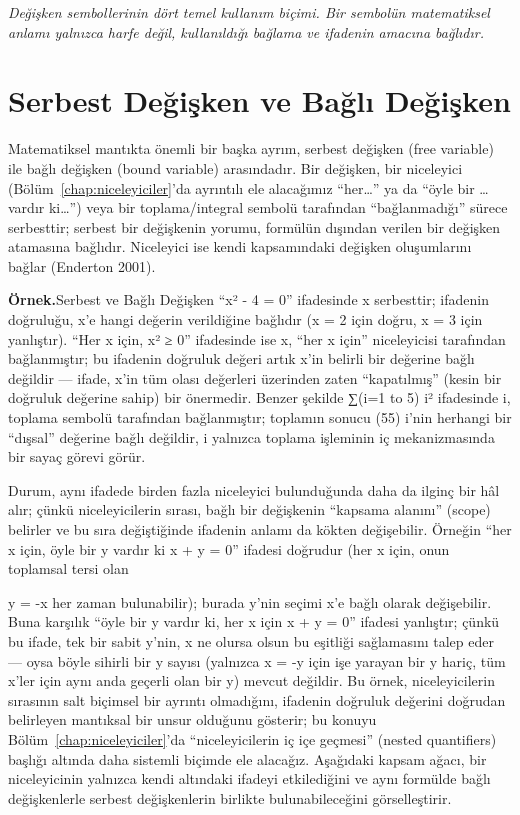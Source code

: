 {\small\itshape\sffamily\color{gray}Değişken sembollerinin dört temel kullanım biçimi. Bir sembolün matematiksel anlamı yalnızca harfe değil, kullanıldığı bağlama ve ifadenin amacına bağlıdır.}

\section{Serbest Değişken ve Bağlı Değişken}

Matematiksel mantıkta önemli bir başka ayrım, serbest değişken (free variable) ile bağlı değişken (bound variable) arasındadır. Bir değişken, bir niceleyici (Bölüm~\ref{chap:niceleyiciler}’da ayrıntılı ele alacağımız “her…” ya da “öyle bir … vardır ki…”) veya bir toplama/integral sembolü tarafından “bağlanmadığı” sürece serbesttir; serbest bir değişkenin yorumu, formülün dışından verilen bir değişken atamasına bağlıdır. Niceleyici ise kendi kapsamındaki değişken oluşumlarını bağlar (Enderton 2001).

\begin{tcolorbox}[bookbox,colback=cEx]\textbf{\textsf{\textcolor{cAcc}{Örnek.}}}\quad Serbest ve Bağlı Değişken “x² - 4 = 0” ifadesinde x serbesttir; ifadenin doğruluğu, x’e hangi değerin verildiğine bağlıdır (x = 2 için doğru, x = 3 için yanlıştır). “Her x için, x² ≥ 0” ifadesinde ise x, “her x için” niceleyicisi tarafından bağlanmıştır; bu ifadenin doğruluk değeri artık x’in belirli bir değerine bağlı değildir — ifade, x’in tüm olası değerleri üzerinden zaten “kapatılmış” (kesin bir doğruluk değerine sahip) bir önermedir. Benzer şekilde ∑(i=1 to 5) i² ifadesinde i, toplama sembolü tarafından bağlanmıştır; toplamın sonucu (55) i’nin herhangi bir “dışsal” değerine bağlı değildir, i yalnızca toplama işleminin iç mekanizmasında bir sayaç görevi görür.\end{tcolorbox}

Durum, aynı ifadede birden fazla niceleyici bulunduğunda daha da ilginç bir hâl alır; çünkü niceleyicilerin sırası, bağlı bir değişkenin “kapsama alanını” (scope) belirler ve bu sıra değiştiğinde ifadenin anlamı da kökten değişebilir. Örneğin “her x için, öyle bir y vardır ki x + y = 0” ifadesi doğrudur (her x için, onun toplamsal tersi olan

y = -x her zaman bulunabilir); burada y’nin seçimi x’e bağlı olarak değişebilir. Buna karşılık “öyle bir y vardır ki, her x için x + y = 0” ifadesi yanlıştır; çünkü bu ifade, tek bir sabit y’nin, x ne olursa olsun bu eşitliği sağlamasını talep eder — oysa böyle sihirli bir y sayısı (yalnızca x = -y için işe yarayan bir y hariç, tüm x’ler için aynı anda geçerli olan bir y) mevcut değildir. Bu örnek, niceleyicilerin sırasının salt biçimsel bir ayrıntı olmadığını, ifadenin doğruluk değerini doğrudan belirleyen mantıksal bir unsur olduğunu gösterir; bu konuyu Bölüm~\ref{chap:niceleyiciler}’da “niceleyicilerin iç içe geçmesi” (nested quantifiers) başlığı altında daha sistemli biçimde ele alacağız. Aşağıdaki kapsam ağacı, bir niceleyicinin yalnızca kendi altındaki ifadeyi etkilediğini ve aynı formülde bağlı değişkenlerle serbest değişkenlerin birlikte bulunabileceğini görselleştirir.

